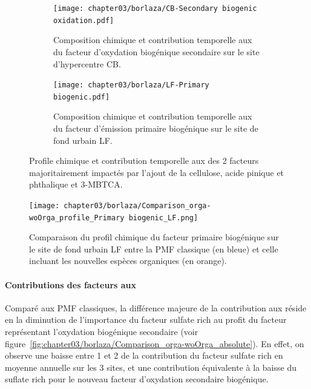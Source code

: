 \begin{figure}[ht]
    \centering
    \begin{subfigure}[t]{1\textwidth}
    \begin{center}
        \texttt{[image: chapter03/borlaza/CB-Secondary biogenic oxidation.pdf]}
    \end{center}
    \caption{Composition chimique et contribution temporelle aux \PMdix{} du facteur
    d'oxydation biogénique secondaire sur le site d'hypercentre CB.}%
    \label{fig:chapter03/borlaza/CB-SBO}
    \end{subfigure}
    \begin{subfigure}[t]{1\textwidth}
    \begin{center}
        \texttt{[image: chapter03/borlaza/LF-Primary biogenic.pdf]}
    \end{center}
    \caption{Composition chimique et contribution temporelle aux \PMdix{} du facteur
    d'émission primaire biogénique sur le site de fond urbain LF.}%
    \label{fig:chapter03/borlaza/LF-PBOA}
    \end{subfigure}
    \caption{Profile chimique et contribution temporelle aux \PMdix{} des 2 facteurs
        majoritairement impactés par l'ajout de la cellulose, acide pinique et phthalique
        et 3-MBTCA.
    }%
    \label{fig:chapter03/borlaza/pmf_profiles}
\end{figure}

\begin{figure}[ht]
    \centering
    \texttt{[image: chapter03/borlaza/Comparison\_orga-woOrga\_profile\_Primary biogenic\_LF.png]}
    \caption{Comparaison du profil chimique du facteur primaire biogénique sur le site de
        fond urbain LF entre la PMF classique (en bleue) et celle incluant les nouvelles
    espèces organiques (en orange).}%
    \label{fig:chapter03/borlaza/comparaison-classique-orga}
\end{figure}

\paragraph{Contributions des facteurs aux \PMdix}%
\label{par:contributions_des_facteurs_aux_pmdix}

Comparé aux PMF classiques, la différence majeure de la contribution aux \PMdix{} réside
en la diminution de l'importance du facteur sulfate rich au profit du facteur représentant
l'oxydation biogénique secondaire (voir
figure~\ref{fig:chapter03/borlaza/Comparison_orga-woOrga_absolute}).  En effet, on
observe une baisse entre \SI{1}{\ugm} et \SI{2}{\ugm} de la contribution du facteur
sulfate rich en moyenne annuelle sur les 3 sites, et une contribution équivalente à la
baisse du suflate rich pour le nouveau facteur d'oxydation secondaire biogénique.


